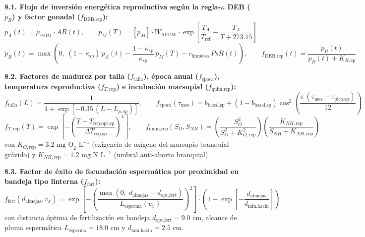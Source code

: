 \documentclass[11pt,letterpaper]{article}
\begin{document}
\begin{formulabox}
\textbf{8.1. Flujo de inversión energética reproductiva según la regla-$\kappa$ DEB ($\dot{p}_R$) y factor gonadal ($f_{\text{DEB,rep}}$):}
\begin{equation}
\dot{p}_A(t) = \mu_{\text{POM}}\cdot AR(t), \qquad \dot{p}_M(T) = \left[\dot{p}_M\right]\cdot W_{\text{AFDW}}\cdot \exp\!\left[\frac{T_A}{T_{\text{ref}}} - \frac{T_A}{T + 273.15}\right]
\label{eq:pdeb}
\end{equation}
\begin{equation}
\dot{p}_R(t) = \max\!\left(0,\; (1 - \kappa_{\text{sp}})\,\dot{p}_A(t) - \frac{1 - \kappa_{\text{sp}}}{\kappa_{\text{sp}}}\,\dot{p}_M(T) - c_{\text{limpieza}}\,PsR(t)\right), \qquad f_{\text{DEB,rep}}(t) = \frac{\dot{p}_R(t)}{\dot{p}_R(t) + K_{R,\text{sp}}}
\label{eq:fdeb_rep}
\end{equation}

\textbf{8.2. Factores de madurez por talla ($f_{\text{talla}}$), época anual ($f_{\text{época}}$), temperatura reproductiva ($f_{T,\text{rep}}$) e incubación marsupial ($f_{\text{quim,rep}}$):}
\begin{equation}
f_{\text{talla}}(L) = \frac{1}{1 + \exp\!\left[-0.35\,(L - L_{p,\text{sp}})\right]}, \qquad f_{\text{época}}(\tau_{\text{mes}}) = b_{\text{basal,sp}} + \left(1 - b_{\text{basal,sp}}\right)\cos^2\!\left(\frac{\pi\,(\tau_{\text{mes}} - \tau_{\text{pico,sp}})}{12}\right)
\label{eq:ftalla_epoca}
\end{equation}
\begin{equation}
f_{T,\text{rep}}(T) = \exp\!\left[-\left(\frac{T - T_{\text{rep,opt,sp}}}{\Delta T_{\text{rep,sp}}}\right)^4\right], \qquad f_{\text{quim,rep}}(S_O, S_{NH}) = \left(\frac{S_O^2}{S_O^2 + K_{O,\text{rep}}^2}\right)\left(\frac{K_{NH,\text{rep}}}{S_{NH} + K_{NH,\text{rep}}}\right)
\label{eq:ftrep_quim}
\end{equation}
con $K_{O,\text{rep}} = 3.2\text{ mg O}_2\text{ L}^{-1}$ (exigencia de oxígeno del marsupio branquial grávido) y $K_{NH,\text{rep}} = 1.2\text{ mg N L}^{-1}$ (umbral anti-aborto branquial).

\textbf{8.3. Factor de éxito de fecundación espermática por proximidad en bandeja tipo linterna ($f_{\text{fert}}$):}
\begin{equation}
f_{\text{fert}}\!\left(d_{\text{almejas}}, v_x\right) = \exp\!\left[-\left(\frac{\max(0,\; d_{\text{almejas}} - d_{\text{opt,fert}})}{L_{\text{esperma}}(v_x)}\right)^2\right]\cdot \left(1 - \exp\!\left[-\frac{d_{\text{almejas}}}{d_{\text{min,hacin}}}\right]\right)
\label{eq:ffert}
\end{equation}
con distancia óptima de fertilización en bandeja $d_{\text{opt,fert}} = 9.0\text{ cm}$, alcance de pluma espermática $L_{\text{esperma}} = 18.0\text{ cm}$ y $d_{\text{min,hacin}} = 2.5\text{ cm}$.


\end{formulabox}
\end{document}
